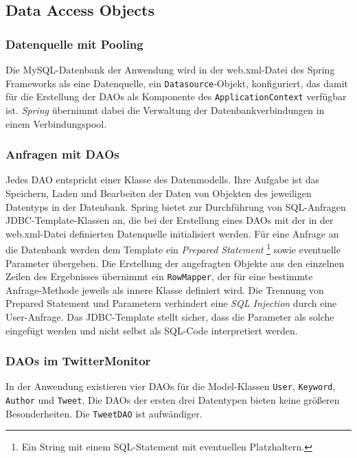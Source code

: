 \subsection{Data Access Objects} 
\subsubsection*{Datenquelle mit Pooling}
Die MySQL-Datenbank der Anwendung wird in der web.xml-Datei des Spring Frameworks als eine 
Datenquelle, ein \texttt{Datasource}-Objekt, konfiguriert, das damit für die Erstellung der DAOs als 
Komponente des \texttt{ApplicationContext} verfügbar ist. \textit{Spring} übernimmt dabei die Verwaltung der 
Datenbankverbindungen in einem Verbindungspool.
%
\subsubsection*{Anfragen mit DAOs}
Jedes DAO entspricht einer Klasse des Datenmodells. Ihre Aufgabe ist das Speichern, Laden und 
Bearbeiten der Daten von Objekten des jeweiligen Datentyps in der Datenbank. Spring bietet zur 
Durchführung von SQL-Anfragen JDBC-Template-Klassen an, die bei der Erstellung eines DAOs mit der in 
der web.xml-Datei definierten Datenquelle initialisiert werden. Für eine Anfrage an die Datenbank 
werden dem Template ein \textit{Prepared Statement} \footnote{Ein String mit einem SQL-Statement mit eventuellen Platzhaltern.} sowie eventuelle Parameter übergeben. Die Erstellung der 
angefragten Objekte aus den einzelnen Zeilen des Ergebnisses übernimmt ein \texttt{RowMapper}, der für eine 
bestimmte Anfrage-Methode jeweils als innere Klasse definiert wird. Die Trennung von Prepared 
Statement und Parametern verhindert eine \textit{SQL Injection} durch eine User-Anfrage. Das JDBC-Template 
stellt sicher, dass die Parameter als solche eingefügt werden und nicht selbst als SQL-Code 
interpretiert werden.

\subsubsection*{DAOs im TwitterMonitor}
In der Anwendung existieren vier DAOs für die Model-Klassen \texttt{User}, \texttt{Keyword}, \texttt{Author} und \texttt{Tweet}. Die 
DAOs der ersten drei Datentypen bieten keine größeren Besonderheiten. Die \texttt{TweetDAO} ist aufwändiger.

